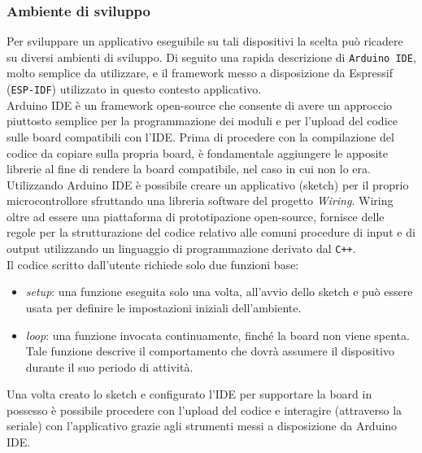 \subsubsection{Ambiente di sviluppo}
Per sviluppare un applicativo eseguibile su tali dispositivi la scelta può ricadere su diversi ambienti di sviluppo. Di seguito una rapida descrizione di \texttt{Arduino IDE}, molto semplice da utilizzare, e il framework messo a disposizione da Espressif (\texttt{ESP-IDF}) utilizzato in questo contesto applicativo.\\
Arduino IDE è un framework open-source che consente di avere un approccio piuttosto semplice per la programmazione dei moduli e per l'upload del codice sulle board compatibili con l'IDE. Prima di procedere con la compilazione del codice da copiare sulla propria board, è fondamentale aggiungere le apposite librerie al fine di rendere la board compatibile, nel caso in cui non lo era.\\
Utilizzando Arduino IDE è possibile creare un applicativo (sketch) per il proprio microcontrollore sfruttando una libreria software del progetto \textit{Wiring}. Wiring oltre ad essere una piattaforma di prototipazione open-source, fornisce delle regole per la strutturazione del codice relativo alle comuni procedure di input e di output utilizzando un linguaggio di programmazione derivato dal \texttt{C++}.\\
Il codice scritto dall'utente richiede solo due funzioni base: 
\begin{itemize}
    \item \textit{setup}: una funzione eseguita solo una volta, all'avvio dello sketch e può essere usata per definire le impostazioni iniziali dell'ambiente.
    \item \textit{loop}: una funzione invocata continuamente, finché la board non viene spenta. Tale funzione descrive il comportamento che dovrà assumere il dispositivo durante il suo periodo di attività.
\end{itemize}
Una volta creato lo sketch e configurato l'IDE per supportare la board in possesso è possibile procedere con l'upload del codice e interagire (attraverso la seriale) con l'applicativo grazie agli strumenti messi a disposizione da Arduino IDE.\\

